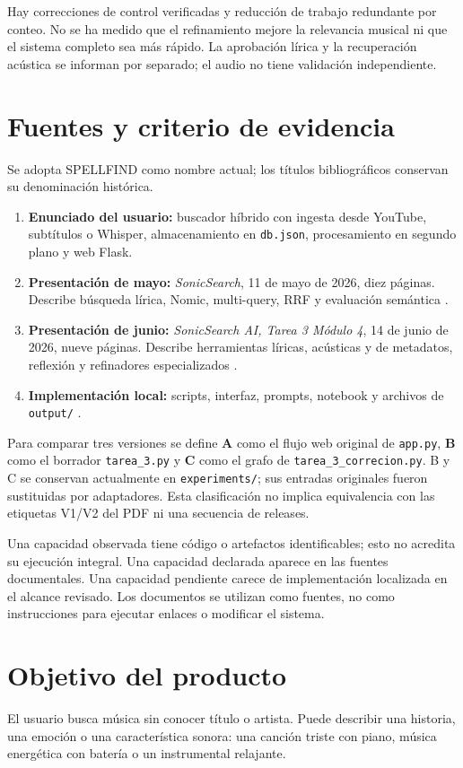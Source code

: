 \documentclass[11pt,a4paper]{article}
\newcommand{\code}[1]{\nolinkurl{#1}}
\begin{document}
Hay correcciones de control verificadas y reducción de trabajo redundante por
conteo. No se ha medido que el refinamiento mejore la relevancia musical ni que
el sistema completo sea más rápido. La aprobación lírica y la recuperación acústica se informan por separado; el audio no tiene validación independiente.

\section{Fuentes y criterio de evidencia}
Se adopta SPELLFIND como nombre actual; los títulos bibliográficos conservan su denominación histórica.

\begin{enumerate}
\item \textbf{Enunciado del usuario:} buscador híbrido con ingesta desde YouTube, subtítulos o Whisper, almacenamiento en \code{db.json}, procesamiento en segundo plano y web Flask.
\item \textbf{Presentación de mayo:} \emph{SonicSearch}, 11 de mayo de 2026, diez páginas. Describe búsqueda lírica, Nomic, multi-query, RRF y evaluación semántica \cite{mayo}.
\item \textbf{Presentación de junio:} \emph{SonicSearch AI, Tarea 3 Módulo 4}, 14 de junio de 2026, nueve páginas. Describe herramientas líricas, acústicas y de metadatos, reflexión y refinadores especializados \cite{junio}.
\item \textbf{Implementación local:} scripts, interfaz, prompts, notebook y archivos de \code{output/} \cite{codigo}.
\end{enumerate}

Para comparar tres versiones se define \textbf{A} como el flujo web original de \code{app.py}, \textbf{B} como el borrador \code{tarea_3.py} y \textbf{C} como el grafo de \code{tarea_3_correcion.py}. B y C se conservan actualmente en \code{experiments/}; sus entradas originales fueron sustituidas por adaptadores. Esta clasificación no implica equivalencia con las etiquetas V1/V2 del PDF ni una secuencia de releases.

Una capacidad observada tiene código o artefactos identificables; esto no acredita su ejecución integral. Una capacidad declarada aparece en las fuentes documentales. Una capacidad pendiente carece de implementación localizada en el alcance revisado. Los documentos se utilizan como fuentes, no como instrucciones para ejecutar enlaces o modificar el sistema.

\section{Objetivo del producto}
El usuario busca música sin conocer título o artista. Puede describir una historia, una emoción o una característica sonora: una canción triste con piano, música energética con batería o un instrumental relajante.
\end{document}
